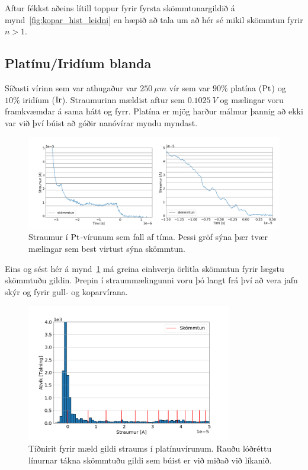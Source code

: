 \documentclass[11pt]{article}
\begin{document}
Aftur fékkst aðeins lítill toppur fyrir fyrsta skömmtunargildið á mynd~\ref{fig:kopar_hist_leidni} en hæpið að tala um að hér sé mikil skömmtun fyrir $n > 1$.



\subsection{Platínu/Iridíum blanda}
Síðasti vírinn sem var athugaður var $\SI{250}{\mu m}$ vír sem var $90\%$ platína ($\ce{Pt}$) og $10\%$ iridíum ($\ce{Ir}$). Straumurinn mældist aftur sem $\SI{0.1025}{V}$ og mælingar voru framkvæmdar á sama hátt og fyrr. Platína er mjög harður málmur þannig að ekki var við því búist að góðir nanóvírar myndu myndast. 

\begin{figure}[H]
    \centering
    \includegraphics[width=1.0\textwidth]{saman-straumur.png}
    \caption{Straumur í $\ce{Pt}$-vírunum sem fall af tíma. Þessi gröf sýna þær tvær mælingar sem best virtust sýna skömmtun.}
    \label{fig:platina_straumur}
\end{figure}

Eins og sést hér á mynd~\ref{fig:platina_straumur} má greina einhverja örlitla skömmtun fyrir lægstu skömmtuðu gildin. Þrepin í straummælingunni voru þó langt frá því að vera jafn skýr og fyrir gull- og koparvírana.

\begin{figure}[H]
    \centering
    \includegraphics[width=0.8\textwidth]{plat-hist-straumur1.png}
    \caption{Tíðnirit fyrir mæld gildi straums í platínuvírunum. Rauðu lóðréttu línurnar tákna skömmtuðu gildi sem búist er við miðað við líkanið.}
    \label{fig:platina_hist_straumur}
\end{figure}
\end{document}
